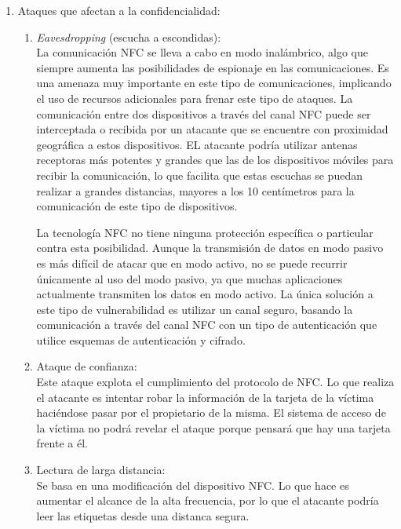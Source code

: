 \documentclass[12pt,a4paper,onecolumn,oneside]{report}
\begin{document}
\begin{enumerate}

\item Ataques que afectan a la confidencialidad:\\
\begin{enumerate}

\item \textit{Eavesdropping} (escucha a escondidas):\\
La comunicación NFC se lleva a cabo en modo inalámbrico, algo que siempre aumenta las posibilidades de espionaje en las comunicaciones. Es una amenaza muy importante en este tipo de comunicaciones, implicando el uso de recursos adicionales para frenar este tipo de ataques.  La comunicación entre dos dispositivos a través del canal NFC puede ser interceptada o recibida por un atacante que se encuentre con proximidad geográfica a estos dispositivos. EL atacante podría utilizar antenas receptoras más potentes y grandes que las de los dispositivos móviles para recibir la comunicación, lo que facilita que estas escuchas se puedan realizar a grandes distancias, mayores a los 10 centímetros para la comunicación de este tipo de dispositivos. 

La tecnología NFC no tiene ninguna protección específica o particular contra esta posibilidad. Aunque la transmisión de datos en modo pasivo es más difícil de atacar que en modo activo, no se puede recurrir únicamente al uso del modo pasivo, ya que muchas aplicaciones actualmente transmiten los datos en modo activo. La única solución a este tipo de vulnerabilidad es utilizar un canal seguro, basando la comunicación a través del canal NFC con un tipo de autenticación que utilice esquemas de autenticación y cifrado.

\item Ataque de confianza:\\
Este ataque explota el cumplimiento del protocolo de NFC. Lo que realiza el atacante es intentar robar la información de la tarjeta de la víctima haciéndose pasar por el propietario de la misma. El sistema de acceso de la víctima no podrá revelar el ataque porque pensará que hay una tarjeta frente a él.

\item Lectura de larga distancia:\\
Se basa en una modificación del dispositivo NFC. Lo que hace es aumentar el alcance de la alta frecuencia, por lo que el atacante podría leer las etiquetas desde una distanca segura.


\end{enumerate}
\end{enumerate}
\end{document}
